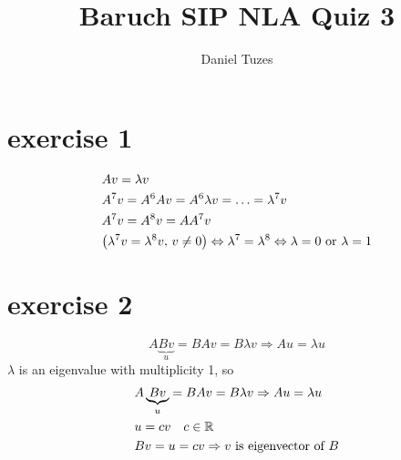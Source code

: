 \documentclass{article}
\title{Baruch SIP NLA Quiz 3}
\author{Daniel Tuzes}
\begin{document}
\maketitle

\section{exercise 1}
\[\begin{gathered}
        Av = \lambda v \hfill \\
        {A^7}v = {A^6}Av = {A^6}\lambda v =  \ldots  = {\lambda ^7}v \hfill \\
        {A^7}v = {A^8}v = A{A^7}v \hfill \\
        \left( {{\lambda ^7}v = {\lambda ^8}v,\,v \ne 0} \right) \Leftrightarrow {\lambda ^7} = {\lambda ^8} \Leftrightarrow \lambda  = 0{\text{ or }}\lambda  = 1 \hfill \\
    \end{gathered} \]

\section{exercise 2}
\[A\underbrace {Bv}_u = BAv = B\lambda v \Rightarrow Au = \lambda u\]
$\lambda$ is an eigenvalue with multiplicity 1, so
\[\begin{gathered}
        A\underbrace {Bv}_u = BAv = B\lambda v \Rightarrow Au = \lambda u \hfill \\
        u = cv\quad c \in \mathbb{R} \hfill \\
        Bv = u = cv \Rightarrow v{\text{ is eigenvector of }}B \hfill \\
    \end{gathered} \]
\end{document}
